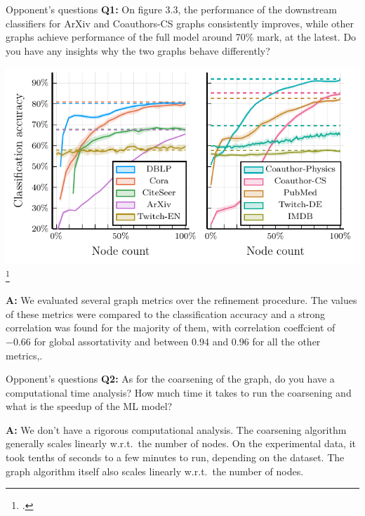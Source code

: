 \documentclass[10pt]{beamer}
\begin{document}
\begin{frame}{Opponent's questions}
	\textbf{Q1:} On figure 3.3, the performance of the downstream classifiers for ArXiv and Coauthors-CS graphs consistently improves, while other graphs achieve performance of the full model around 70\% mark, at the latest. Do you have any insights why the two graphs behave differently?
	\begin{center}
		\includegraphics[width=0.5\pagewidth]{images/adaptive-coarsening/adaptive-coarsening.pdf}\footcite{dedic_balancing_2024}
	\end{center}

	\textbf{A:} We evaluated several graph metrics over the refinement procedure. The values of these metrics were compared to the classification accuracy and a strong correlation was found for the majority of them, with correlation coeffcient of −0.66 for global assortativity and between 0.94 and 0.96 for all the other metrics,.
\end{frame}

\begin{frame}{Opponent's questions}
	\textbf{Q2:} As for the coarsening of the graph, do you have a computational time analysis? How much time it takes to run the coarsening and what is the speedup of the ML model?

	\textbf{A:} We don't have a rigorous computational analysis. The coarsening algorithm generally scales linearly w.r.t.\ the number of nodes. On the experimental data, it took tenths of seconds to a few minutes to run, depending on the dataset. The graph algorithm itself also scales linearly w.r.t.\ the number of nodes.
\end{frame}
\end{document}
